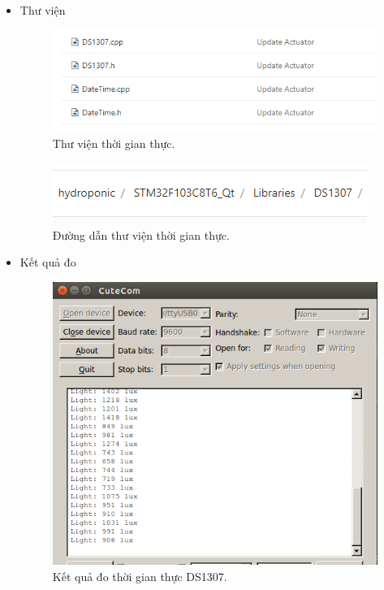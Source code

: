 \documentclass[a4paper,12pt,oneside]{article}
\begin{document}
\begin{enumerate}
\begin{itemize}
		\item Thư viện
			\begin{figure}[H]
			\centering
			\begin{center}
			\includegraphics[scale=.7]{hinh/lib_realtime.PNG}
			\end{center}
			\caption{Thư viện thời gian thực.}
			\end{figure}
			
			\begin{figure}[H]
			\centering
			\begin{center}
			\includegraphics[scale=.7]{hinh/path_realtime.PNG}
			\end{center}
			\caption{Đường dẫn thư viện thời gian thực.}
			\end{figure}
		\item Kết quả đo
			\begin{figure}[H]
			\centering
			\begin{center}
			\includegraphics[scale=.6]{hinh/result_light.PNG} %
			\end{center}
			\caption{Kết quả đo thời gian thực DS1307.}
			\end{figure}			
		

\end{itemize}
\end{enumerate}
\end{document}
